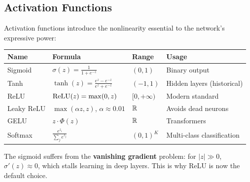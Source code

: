 \subsection{Activation Functions}

Activation functions introduce the nonlinearity essential to the network's expressive power:

\begin{center}
\begin{tabular}{llll}
\toprule
\textbf{Name} & \textbf{Formula} & \textbf{Range} & \textbf{Usage} \\
\midrule
Sigmoid & $\sigma(z) = \frac{1}{1+e^{-z}}$ & $(0,1)$ & Binary output \\[6pt]
Tanh & $\tanh(z) = \frac{e^z - e^{-z}}{e^z + e^{-z}}$ & $(-1,1)$ & Hidden layers (historical) \\[6pt]
ReLU & $\mathrm{ReLU}(z) = \max(0,z)$ & $[0,+\infty)$ & Modern standard \\[6pt]
Leaky ReLU & $\max(\alpha z, z)$, $\alpha\approx 0.01$ & $\mathbb{R}$ & Avoids dead neurons \\[6pt]
GELU & $z \cdot \Phi(z)$ & $\mathbb{R}$ & Transformers \\[6pt]
Softmax & $\frac{e^{z_i}}{\sum_j e^{z_j}}$ & $(0,1)^K$ & Multi-class classification \\
\bottomrule
\end{tabular}
\end{center}

\begin{center}
\end{center}

\begin{warning}
The sigmoid suffers from the \textbf{vanishing gradient} problem: for $|z| \gg 0$, $\sigma'(z) \approx 0$, which stalls learning in deep layers. This is why ReLU is now the default choice.
\end{warning}

